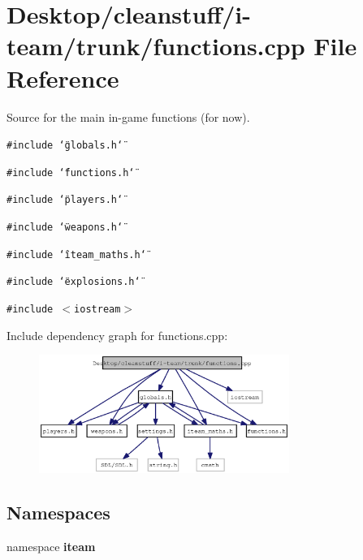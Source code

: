 \section{Desktop/cleanstuff/i-team/trunk/functions.cpp File Reference}
\label{functions_8cpp}
Source for the main in-game functions (for now). 

{\tt \#include \char`\"{}globals.h\char`\"{}}\par
{\tt \#include \char`\"{}functions.h\char`\"{}}\par
{\tt \#include \char`\"{}players.h\char`\"{}}\par
{\tt \#include \char`\"{}weapons.h\char`\"{}}\par
{\tt \#include \char`\"{}iteam\_\-maths.h\char`\"{}}\par
{\tt \#include \char`\"{}explosions.h\char`\"{}}\par
{\tt \#include $<$iostream$>$}\par


Include dependency graph for functions.cpp:\nopagebreak
\begin{figure}[H]
\begin{center}
\leavevmode
\includegraphics[width=231pt]{functions_8cpp__incl}
\end{center}
\end{figure}
\subsection*{Namespaces}
\begin{CompactItemize}
\item 
namespace {\bf iteam}
\end{CompactItemize}
